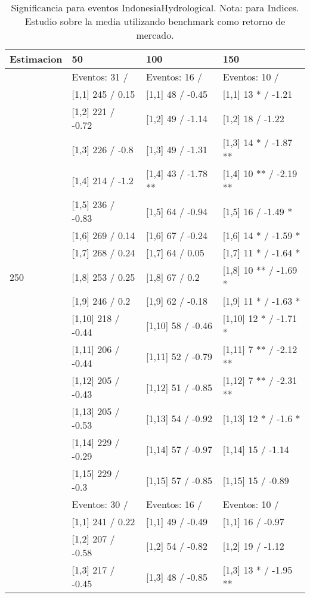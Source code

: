 \begin{table}

\caption{Significancia para eventos IndonesiaHydrological. Nota: para Indices. Estudio sobre la media utilizando benchmark como retorno de mercado.}
\centering
\begin{tabular}[t]{llll}
\toprule
Estimacion & 50 & 100 & 150\\
\midrule
 & Eventos:  31 / & Eventos:  16 / & Eventos:  10 /\\
 & {}[1,1] 245  / 0.15 & {}[1,1] 48  / -0.45 & {}[1,1] 13 * / -1.21\\
 & {}[1,2] 221  / -0.72 & {}[1,2] 49  / -1.14 & {}[1,2] 18  / -1.22\\
 & {}[1,3] 226  / -0.8 & {}[1,3] 49  / -1.31 & {}[1,3] 14 * / -1.87 **\\
 & {}[1,4] 214  / -1.2 & {}[1,4] 43  / -1.78 ** & {}[1,4] 10 ** / -2.19 **\\
\addlinespace
 & {}[1,5] 236  / -0.83 & {}[1,5] 64  / -0.94 & {}[1,5] 16  / -1.49 *\\
 & {}[1,6] 269  / 0.14 & {}[1,6] 67  / -0.24 & {}[1,6] 14 * / -1.59 *\\
 & {}[1,7] 268  / 0.24 & {}[1,7] 64  / 0.05 & {}[1,7] 11 * / -1.64 *\\
250 & {}[1,8] 253  / 0.25 & {}[1,8] 67  / 0.2 & {}[1,8] 10 ** / -1.69 *\\
 & {}[1,9] 246  / 0.2 & {}[1,9] 62  / -0.18 & {}[1,9] 11 * / -1.63 *\\
\addlinespace
 & {}[1,10] 218  / -0.44 & {}[1,10] 58  / -0.46 & {}[1,10] 12 * / -1.71 *\\
 & {}[1,11] 206  / -0.44 & {}[1,11] 52  / -0.79 & {}[1,11] 7 ** / -2.12 **\\
 & {}[1,12] 205  / -0.43 & {}[1,12] 51  / -0.85 & {}[1,12] 7 ** / -2.31 **\\
 & {}[1,13] 205  / -0.53 & {}[1,13] 54  / -0.92 & {}[1,13] 12 * / -1.6 *\\
 & {}[1,14] 229  / -0.29 & {}[1,14] 57  / -0.97 & {}[1,14] 15  / -1.14\\
\addlinespace
 & {}[1,15] 229  / -0.3 & {}[1,15] 57  / -0.85 & {}[1,15] 15  / -0.89\\
 & Eventos:  30 / & Eventos:  16 / & Eventos:  10 /\\
 & {}[1,1] 241  / 0.22 & {}[1,1] 49  / -0.49 & {}[1,1] 16  / -0.97\\
 & {}[1,2] 207  / -0.58 & {}[1,2] 54  / -0.82 & {}[1,2] 19  / -1.12\\
 & {}[1,3] 217  / -0.45 & {}[1,3] 48  / -0.85 & {}[1,3] 13 * / -1.95 **\\

\end{tabular}
\end{table}
